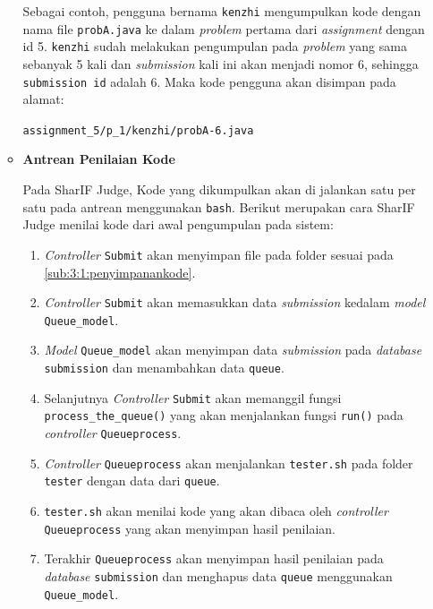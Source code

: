 \documentclass[a4paper,twoside]{article}
\begin{document}
\begin{enumerate}
\begin{itemize}
		            Sebagai contoh, pengguna bernama \verb|kenzhi| mengumpulkan kode dengan nama file \verb|probA.java| ke dalam \textit{problem} pertama dari \textit{assignment} dengan id 5. \verb|kenzhi| sudah melakukan pengumpulan pada \textit{problem} yang sama sebanyak 5 kali dan \textit{submission} kali ini akan menjadi nomor 6, sehingga \verb|submission id| adalah 6. Maka kode pengguna akan disimpan pada alamat:

		            \begin{center}
			            \verb|assignment_5/p_1/kenzhi/probA-6.java|
		            \end{center}

		      \item \textbf{Antrean Penilaian Kode}
		            \label{sub:3:1:antreanpenilaiankode}

		            Pada SharIF Judge, Kode yang dikumpulkan akan di jalankan satu per satu pada antrean menggunakan \verb|bash|. Berikut merupakan cara SharIF Judge menilai kode dari awal pengumpulan pada sistem:

		            \begin{enumerate}
			            \item \textit{Controller} \verb|Submit| akan menyimpan file pada folder sesuai pada \ref{sub:3:1:penyimpanankode}.
			            \item \textit{Controller} \verb|Submit| akan memasukkan data \textit{submission} kedalam \textit{model} \verb|Queue_model|.
			            \item \textit{Model} \verb|Queue_model| akan menyimpan data \textit{submission} pada \textit{database} \verb|submission| dan menambahkan data \verb|queue|.
			            \item Selanjutnya \textit{Controller} \verb|Submit| akan memanggil fungsi \verb|process_the_queue()| yang akan menjalankan fungsi \verb|run()| pada \textit{controller} \verb|Queueprocess|.
			            \item \textit{Controller} \verb|Queueprocess| akan menjalankan \verb|tester.sh| pada folder \verb|tester| dengan data dari \verb|queue|.
			            \item \verb|tester.sh| akan menilai kode yang akan dibaca oleh \textit{controller} \verb|Queueprocess| yang akan menyimpan hasil penilaian.
			            \item Terakhir \verb|Queueprocess| akan menyimpan hasil penilaian pada \textit{database} \verb|submission| dan menghapus data \verb|queue| menggunakan \verb|Queue_model|.
		            \end{enumerate}


\end{itemize}
\end{enumerate}
\end{document}
